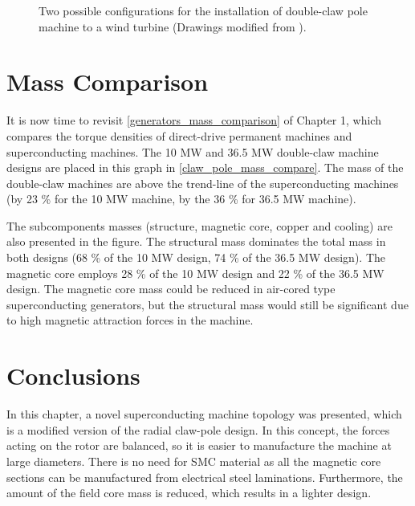 \documentclass[12pt]{iopart}
\begin{document}
\begin{figure}[h!]
  \caption{Two possible configurations for the installation of double-claw pole machine to a wind turbine (Drawings modified from \cite{Bang2010}).} 
  \label{DD_claw_pole_structures}
\end{figure}

\section{Mass Comparison}

It is now time to revisit \ref{generators_mass_comparison} of Chapter 1, which compares the torque densities of direct-drive permanent machines and superconducting machines. The 10 MW and 36.5 MW double-claw machine designs are placed in this graph in \ref{claw_pole_mass_compare}. The mass of the double-claw machines are above the trend-line of the superconducting machines (by 23 \% for the 10 MW machine, by the 36 \% for 36.5 MW machine).

The subcomponents masses (structure, magnetic core, copper and cooling) are also presented in the figure. The structural mass dominates the total mass in both designs (68 \% of the 10 MW design, 74 \% of the 36.5 MW design). The magnetic core employs 28 \% of the 10 MW design and 22 \% of the 36.5 MW design. The magnetic core mass could be reduced in air-cored type superconducting generators, but the structural mass would still be significant due to high magnetic attraction forces in the machine.


\section{Conclusions}

In this chapter, a novel superconducting machine topology was presented, which is a modified version of the radial claw-pole design. In this concept, the forces acting on the rotor  are balanced, so it is easier to manufacture the machine at large diameters. There is no need for SMC material as all the magnetic core sections can be manufactured from electrical steel laminations. Furthermore, the amount of the field core mass is reduced, which results in a lighter design.
\end{document}
